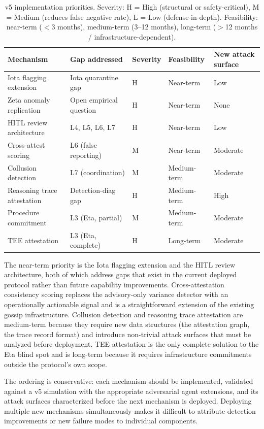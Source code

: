 \begin{table}[h]
\centering
\caption{v5 implementation priorities. Severity: H = High (structural or safety-critical),
         M = Medium (reduces false negative rate), L = Low (defense-in-depth).
         Feasibility: near-term ($<$3 months), medium-term (3--12 months),
         long-term ($>$12 months / infrastructure-dependent).}
\label{tab:v5_roadmap}
\begin{tabular}{lllll}
\hline
\textbf{Mechanism} & \textbf{Gap addressed} & \textbf{Severity} &
\textbf{Feasibility} & \textbf{New attack surface} \\
\hline
Iota flagging extension     & Iota quarantine gap     & H & Near-term   & Low \\
Zeta anomaly replication    & Open empirical question & H & Near-term   & None \\
HITL review architecture    & L4, L5, L6, L7         & H & Near-term   & Low \\
Cross-attest scoring        & L6 (false reporting)    & M & Near-term   & Moderate \\
Collusion detection         & L7 (coordination)       & M & Medium-term & Moderate \\
Reasoning trace attestation & Detection-diag gap      & H & Medium-term & High \\
Procedure commitment        & L3 (Eta, partial)       & M & Medium-term & Moderate \\
TEE attestation             & L3 (Eta, complete)      & H & Long-term   & Moderate \\
\hline
\end{tabular}
\end{table}

The near-term priority is the Iota flagging extension and the HITL review
architecture, both of which address gaps that exist in the current deployed protocol
rather than future capability improvements.  Cross-attestation consistency scoring
replaces the advisory-only variance detector with an operationally actionable signal
and is a straightforward extension of the existing gossip infrastructure.  Collusion
detection and reasoning trace attestation are medium-term because they require new
data structures (the attestation graph, the trace record format) and introduce
non-trivial attack surfaces that must be analyzed before deployment.  TEE attestation
is the only complete solution to the Eta blind spot and is long-term because it
requires infrastructure commitments outside the protocol's own scope.

The ordering is conservative: each mechanism should be implemented, validated against
a v5 simulation with the appropriate adversarial agent extensions, and its attack
surfaces characterized before the next mechanism is deployed.  Deploying multiple
new mechanisms simultaneously makes it difficult to attribute detection improvements
or new failure modes to individual components.
